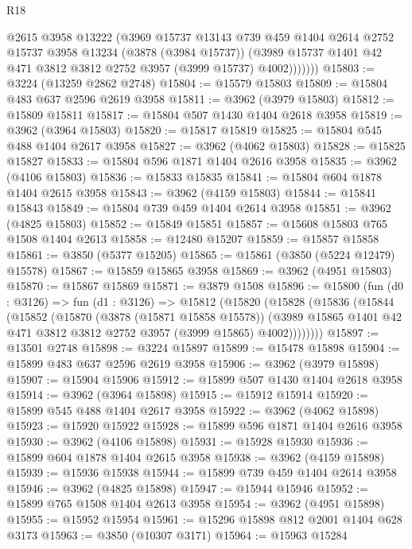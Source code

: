 \begin{lexlean}{R18}
\begin{coremodule}
              @2615
              @3958
              @13222
              (@3969
                @15737
                @13143
                @739
                @459
                @1404
                @2614
                @2752
                @15737
                @3958
                @13234
                (@3878 (@3984 @15737))
                (@3989 @15737 @1401 @42 @471 @3812 @3812 @2752 @3957 (@3999 @15737) @4002)))))))
@15803 := @3224 (@13259 @2862 @2748)
@15804 := @15579 @15803
@15809 := @15804 @483 @637 @2596 @2619 @3958
@15811 := @3962 (@3979 @15803)
@15812 := @15809 @15811
@15817 := @15804 @507 @1430 @1404 @2618 @3958
@15819 := @3962 (@3964 @15803)
@15820 := @15817 @15819
@15825 := @15804 @545 @488 @1404 @2617 @3958
@15827 := @3962 (@4062 @15803)
@15828 := @15825 @15827
@15833 := @15804 @596 @1871 @1404 @2616 @3958
@15835 := @3962 (@4106 @15803)
@15836 := @15833 @15835
@15841 := @15804 @604 @1878 @1404 @2615 @3958
@15843 := @3962 (@4159 @15803)
@15844 := @15841 @15843
@15849 := @15804 @739 @459 @1404 @2614 @3958
@15851 := @3962 (@4825 @15803)
@15852 := @15849 @15851
@15857 := @15608 @15803 @765 @1508 @1404 @2613
@15858 := @12480 @15207
@15859 := @15857 @15858
@15861 := @3850 (@5377 @15205)
@15865 := @15861 (@3850 (@5224 @12479) @15578)
@15867 := @15859 @15865 @3958
@15869 := @3962 (@4951 @15803)
@15870 := @15867 @15869
@15871 := @3879 @1508
@15896 := @15800
    (fun (d0 : @3126) =>
    fun (d1 : @3126) =>
    @15812
      (@15820
        (@15828
          (@15836
            (@15844
              (@15852
                (@15870
                  (@3878 (@15871 @15858 @15578))
                  (@3989 @15865 @1401 @42 @471 @3812 @3812 @2752 @3957 (@3999 @15865) @4002))))))))
@15897 := @13501 @2748
@15898 := @3224 @15897
@15899 := @15478 @15898
@15904 := @15899 @483 @637 @2596 @2619 @3958
@15906 := @3962 (@3979 @15898)
@15907 := @15904 @15906
@15912 := @15899 @507 @1430 @1404 @2618 @3958
@15914 := @3962 (@3964 @15898)
@15915 := @15912 @15914
@15920 := @15899 @545 @488 @1404 @2617 @3958
@15922 := @3962 (@4062 @15898)
@15923 := @15920 @15922
@15928 := @15899 @596 @1871 @1404 @2616 @3958
@15930 := @3962 (@4106 @15898)
@15931 := @15928 @15930
@15936 := @15899 @604 @1878 @1404 @2615 @3958
@15938 := @3962 (@4159 @15898)
@15939 := @15936 @15938
@15944 := @15899 @739 @459 @1404 @2614 @3958
@15946 := @3962 (@4825 @15898)
@15947 := @15944 @15946
@15952 := @15899 @765 @1508 @1404 @2613 @3958
@15954 := @3962 (@4951 @15898)
@15955 := @15952 @15954
@15961 := @15296 @15898 @812 @2001 @1404 @628 @3173
@15963 := @3850 (@10307 @3171)
@15964 := @15963 @15284

\end{coremodule}
\end{lexlean}
